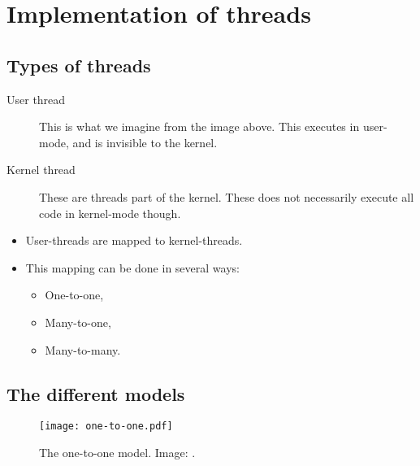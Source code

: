 \documentclass{beamer}
\begin{document}
\section[Implementation]{Implementation of threads}

\subsection{Types of threads}

\begin{frame}{\insertsubsectionhead}
  \begin{description}
    \item[User thread] This is what we imagine from the image above.
      This executes in user-mode, and is invisible to the kernel.

    \item[Kernel thread] These are threads part of the kernel.
      These does not necessarily execute all code in kernel-mode though.
  \end{description}
\end{frame}

\begin{frame}{\insertsubsectionhead}
  \begin{itemize}
    \item User-threads are mapped to kernel-threads.
    \item This mapping can be done in several ways:
      \begin{itemize}
        \item One-to-one,
        \item Many-to-one,
        \item Many-to-many.
      \end{itemize}
  \end{itemize}
\end{frame}

\subsection{The different models}

\begin{frame}{\insertsubsectionhead}
  \begin{figure}
    \texttt{[image: one-to-one.pdf]}
    \caption{The one-to-one model.
      Image: \cite{Silberschatz2013osc}.}
  \end{figure}
\end{frame}
\end{document}
